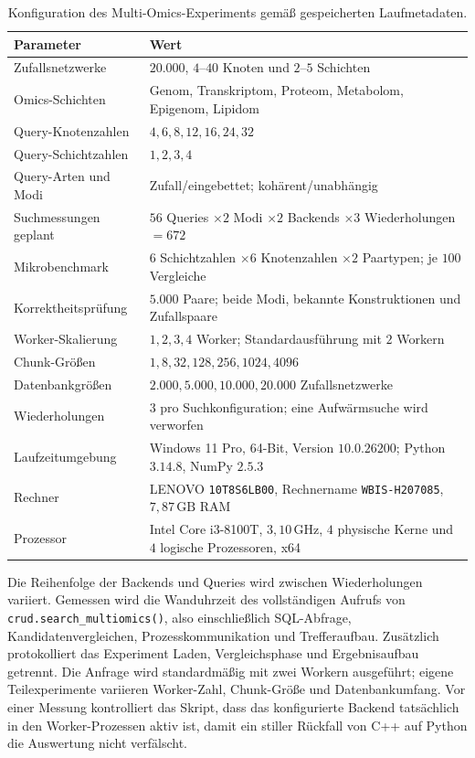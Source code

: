 \documentclass[a4paper,12pt, twoside]{report}
\theoremstyle{definition}
\begin{document}
\begin{table}[!h]
\centering
\small
\caption{Konfiguration des Multi-Omics-Experiments gemäß gespeicherten Laufmetadaten.}
\label{tab:multiomics_setup}
\begin{tabular}{@{}>{\raggedright\arraybackslash}p{5.2cm}>{\raggedright\arraybackslash}p{8.2cm}@{}}
\toprule
Parameter & Wert \\
\midrule
Zufallsnetzwerke & $20.000$, $4$--$40$ Knoten und $2$--$5$ Schichten \\
Omics-Schichten & Genom, Transkriptom, Proteom, Metabolom, Epigenom, Lipidom \\
Query-Knotenzahlen & $4,6,8,12,16,24,32$ \\
Query-Schichtzahlen & $1,2,3,4$ \\
Query-Arten und Modi & Zufall/eingebettet; kohärent/unabhängig \\
Suchmessungen geplant & $56$ Queries $\times 2$ Modi $\times 2$ Backends $\times 3$ Wiederholungen $=672$ \\
Mikrobenchmark & $6$ Schichtzahlen $\times 6$ Knotenzahlen $\times 2$ Paartypen; je $100$ Vergleiche \\
Korrektheitsprüfung & $5.000$ Paare; beide Modi, bekannte Konstruktionen und Zufallspaare \\
Worker-Skalierung & $1,2,3,4$ Worker; Standardausführung mit $2$ Workern \\
Chunk-Größen & $1,8,32,128,256,1024,4096$ \\
Datenbankgrößen & $2.000,5.000,10.000,20.000$ Zufallsnetzwerke \\
Wiederholungen & $3$ pro Suchkonfiguration; eine Aufwärmsuche wird verworfen \\
Laufzeitumgebung & Windows 11 Pro, 64-Bit, Version $10.0.26200$; Python $3.14.8$, NumPy $2.5.3$ \\
Rechner & LENOVO \texttt{10T8S6LB00}, Rechnername \texttt{WBIS-H207085}, $7{,}87\,\mathrm{GB}$ RAM \\
Prozessor & Intel Core i3-8100T, $3{,}10\,\mathrm{GHz}$, $4$ physische Kerne und $4$ logische Prozessoren, x64 \\
\bottomrule
\end{tabular}
\end{table}

Die Reihenfolge der Backends und Queries wird zwischen Wiederholungen variiert. Gemessen wird die Wanduhrzeit des vollständigen Aufrufs von \texttt{crud.search\_multiomics()}, also einschließlich SQL-Abfrage, Kandidatenvergleichen, Prozesskommunikation und Trefferaufbau. Zusätzlich protokolliert das Experiment Laden, Vergleichsphase und Ergebnisaufbau getrennt. Die Anfrage wird standardmäßig mit zwei Workern ausgeführt; eigene Teilexperimente variieren Worker-Zahl, Chunk-Größe und Datenbankumfang. Vor einer Messung kontrolliert das Skript, dass das konfigurierte Backend tatsächlich in den Worker-Prozessen aktiv ist, damit ein stiller Rückfall von C++ auf Python die Auswertung nicht verfälscht.
\end{document}
